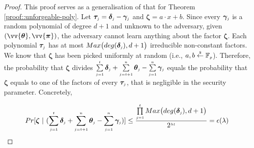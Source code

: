 

\begin{proof}  
This proof serves as a generalisation of that for Theorem \ref{proof::unforgeable-poly}.  
Let $\bm\tau_{\scriptscriptstyle j}=\bm\delta_{\scriptscriptstyle j}-\bm\gamma_{\scriptscriptstyle j}$ and $\bm\zeta=a\cdot x+b$. Since  every $\bm\gamma_{\scriptscriptstyle j}$ is a random polynomial of degree $d+1$ and unknown to the adversary, given $(\vv{\bm\theta}, \vv{\bm\pi})$,  the adversary cannot learn anything about the factor $\bm\zeta$. Each polynomial $\bm\tau_{\scriptscriptstyle j}$ has at most $Max\big(deg(\bm\delta_{\scriptscriptstyle j}), d+1\big)$ irreducible non-constant factors. 
%
%
We  know that $\bm\zeta$ has been picked uniformly at random (i.e., $a,b
\stackrel{\scriptscriptstyle \$}\leftarrow \mathbb F_{\scriptscriptstyle p}$). Therefore, the probability that $\bm\zeta$ divides $\sum\limits_{\scriptscriptstyle j=1}^{\scriptscriptstyle t}\bm\delta_{\scriptscriptstyle j} + \sum\limits_{\scriptscriptstyle j=t+1}^{\scriptscriptstyle n}\bm\theta_{\scriptscriptstyle j} - \sum\limits_{\scriptscriptstyle j=1}^{\scriptscriptstyle n}\bm\gamma_{\scriptscriptstyle j}$ equals the probability that $\bm\zeta$ equals to one of the factors of  every $\bm\tau_{\scriptscriptstyle j}$, that is negligible in the security parameter. Concretely,


$$Pr[ \bm\zeta \ | \ (\sum\limits_{\scriptscriptstyle j=1}^{\scriptscriptstyle t}\bm\delta_{\scriptscriptstyle j} + \sum\limits_{\scriptscriptstyle j=t+1}^{\scriptscriptstyle n}\bm\theta_{\scriptscriptstyle j} - \sum\limits_{\scriptscriptstyle j=1}^{\scriptscriptstyle n}\bm\gamma_{\scriptscriptstyle j} ) ]\leq  \frac{\prod \limits^{\scriptscriptstyle t}_{\scriptscriptstyle j=1}Max\big(deg(\bm\delta_{\scriptscriptstyle j}), d+1\big)} {2^{\scriptscriptstyle \lambda t}}=\epsilon(\lambda)$$
%
\end{proof} 










